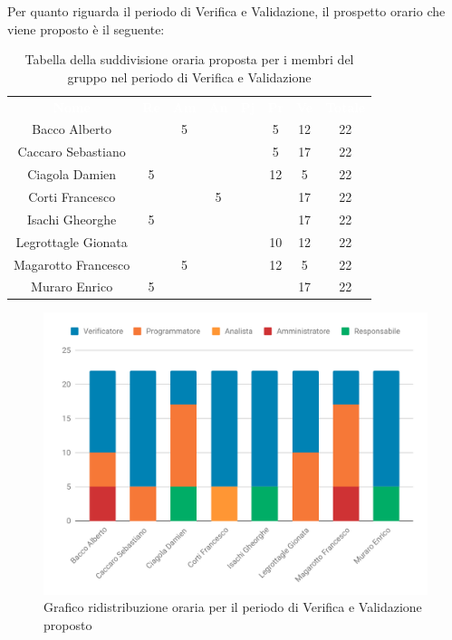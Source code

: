 Per quanto riguarda il periodo di Verifica e Validazione, il prospetto orario che viene proposto è il seguente:
\begin{table}[H]	
	\begin{center}
	    \begin{tabular}{cccccccc}
			\rowcolor{greySWEight}
			\textcolor{white}{\textbf{Nome}} & \textcolor{white}{\textbf{Re}} & \textcolor{white}{\textbf{Am}} & \textcolor{white}{\textbf{An}} & \textcolor{white}{\textbf{Pj}} & \textcolor{white}{\textbf{Pr}} & \textcolor{white}{\textbf{Ve}} & \textcolor{white}{\textbf{Totale}}
			\\
			Bacco Alberto & & 5 & & & 5 & 12 & 22 \\
			Caccaro Sebastiano & & & & & 5 & 17 & 22 \\
			Ciagola Damien & 5 & & & & 12 & 5 & 22 \\
			Corti Francesco & & & 5 & & & 17 & 22 \\
			Isachi Gheorghe & 5 & & & & & 17 & 22 \\
			Legrottagle Gionata & & & & & 10 & 12 & 22 \\
			Magarotto Francesco & & 5 & & & 12 & 5 & 22 \\
			Muraro Enrico & 5 & & & & & 17 & 22 \\
			\end{tabular}
	    \caption{Tabella della suddivisione oraria proposta per i membri del gruppo nel periodo di Verifica e Validazione} \label{tab:tabellaPropostaPersoneVerifica e validazione} 
	\end{center}
\end{table}
\begin{figure}[H]
\includegraphics[width=1\linewidth]{Consuntivo/grafici/ConsVV1.pdf}
\caption{Grafico ridistribuzione oraria per il periodo di Verifica e Validazione proposto}
\end{figure}
